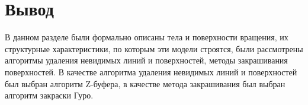
\section*{Вывод}

В данном разделе были формально описаны тела и поверхности вращения, их структурные характеристики, по которым эти модели строятся,
были рассмотрены алгоритмы удаления невидимых линий и поверхностей,
методы закрашивания поверхностей.
В качестве алгоритма удаления невидимых линий и поверхностей был выбран алгоритм Z-буфера,
в качестве метода закрашивания был выбран алгоритм закраски Гуро.
